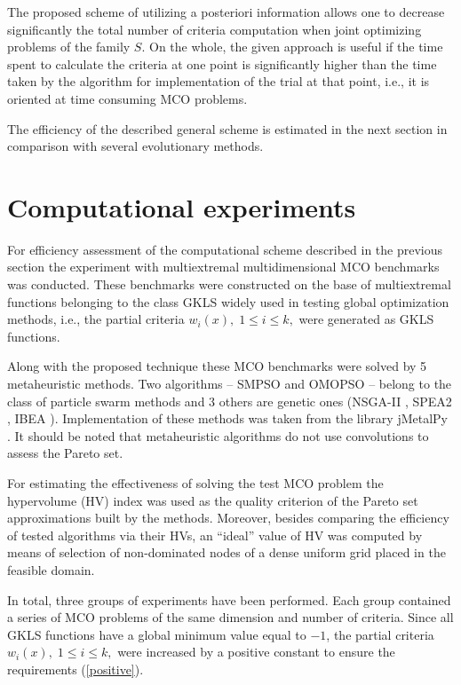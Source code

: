 \documentclass[runningheads]{llncs}
\begin{document}
The proposed scheme of utilizing a posteriori information allows one to decrease significantly the total number of criteria computation when joint optimizing problems of the family $S$. On the whole, the given approach is useful  if the time spent to calculate the criteria at one point is significantly higher than the time taken by the algorithm for implementation of the trial at that point, i.e., it is oriented at time consuming MCO problems.
 
The efficiency of the described general scheme is estimated in the next section in comparison with several evolutionary methods. 

\section{Computational experiments}

For efficiency assessment of the computational scheme described in the previous section the experiment with multiextremal multidimensional MCO benchmarks was conducted. These benchmarks were constructed on the base of multiextremal functions belonging to the class GKLS \cite{Gaviano2003} widely used in testing global optimization methods, i.e., the partial criteria $w_i(x), \; 1 \leq i \leq k,$ were generated as GKLS functions.

Along with the proposed technique these MCO benchmarks were solved by 5 metaheuristic methods. Two algorithms -- SMPSO \cite{Nebro2009} and OMOPSO \cite{Durillo2010} -- belong to the class of particle swarm methods and 3 others are genetic ones (NSGA-II \cite{Deb2002}, SPEA2 \cite{Zitzler2001}, IBEA \cite{Zitzler2004}). Implementation of these methods was taken from the library jMetalPy \cite{Benitez2019}. It should be noted that metaheuristic algorithms do not use convolutions to assess the Pareto set.

For estimating the effectiveness of solving the test MCO problem the hypervolume (HV) index  \cite{Evtushenko2014} was used as the quality criterion of the Pareto set approximations built by the methods. Moreover, besides comparing the efficiency of tested algorithms via their HVs, an ``ideal'' value of HV was computed by means of selection of non-dominated nodes of a dense uniform grid placed in the feasible domain.

In total, three groups of experiments have been performed. Each group contained a series of MCO problems of the same dimension and number of criteria. Since all GKLS functions have a global minimum value equal to $-1$, the partial  criteria $w_i(x), \; 1 \leq i \leq k,$  were increased by a positive constant to ensure the requirements (\ref{positive}).
\end{document}
